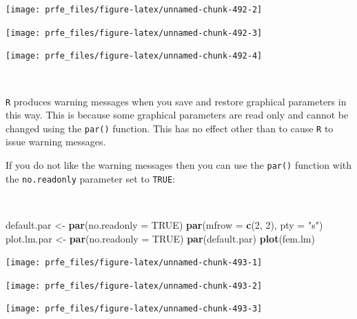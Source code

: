 \documentclass[12pt,a4paper]{book}
\newenvironment{Shaded}{\begin{snugshade}}{\end{snugshade}}
\newcommand{\KeywordTok}[1]{\textcolor[rgb]{0.13,0.29,0.53}{\textbf{#1}}}
\newcommand{\DataTypeTok}[1]{\textcolor[rgb]{0.13,0.29,0.53}{#1}}
\newcommand{\DecValTok}[1]{\textcolor[rgb]{0.00,0.00,0.81}{#1}}
\newcommand{\StringTok}[1]{\textcolor[rgb]{0.31,0.60,0.02}{#1}}
\newcommand{\OtherTok}[1]{\textcolor[rgb]{0.56,0.35,0.01}{#1}}
\newcommand{\NormalTok}[1]{#1}
\theoremstyle{definition}
\theoremstyle{definition}
\theoremstyle{definition}
\theoremstyle{remark}
\begin{document}
\begin{center}\texttt{[image: prfe\_files/figure-latex/unnamed-chunk-492-2]} \end{center}

\begin{center}\texttt{[image: prfe\_files/figure-latex/unnamed-chunk-492-3]} \end{center}

\begin{center}\texttt{[image: prfe\_files/figure-latex/unnamed-chunk-492-4]} \end{center}

~

\texttt{R} produces warning messages when you save and restore graphical
parameters in this way. This is because some graphical parameters are
read only and cannot be changed using the \texttt{par()} function. This
has no effect other than to cause \texttt{R} to issue warning messages.

If you do not like the warning messages then you can use the
\texttt{par()} function with the \texttt{no.readonly} parameter set to
\texttt{TRUE}:

~

\begin{Shaded}
\begin{Highlighting}[]
\NormalTok{default.par <-}\StringTok{ }\KeywordTok{par}\NormalTok{(}\DataTypeTok{no.readonly =} \OtherTok{TRUE}\NormalTok{)}
\KeywordTok{par}\NormalTok{(}\DataTypeTok{mfrow =} \KeywordTok{c}\NormalTok{(}\DecValTok{2}\NormalTok{, }\DecValTok{2}\NormalTok{), }\DataTypeTok{pty =} \StringTok{"s"}\NormalTok{)}
\NormalTok{plot.lm.par <-}\StringTok{ }\KeywordTok{par}\NormalTok{(}\DataTypeTok{no.readonly =} \OtherTok{TRUE}\NormalTok{)}
\KeywordTok{par}\NormalTok{(default.par)}
\KeywordTok{plot}\NormalTok{(fem.lm)}
\end{Highlighting}
\end{Shaded}

\begin{center}\texttt{[image: prfe\_files/figure-latex/unnamed-chunk-493-1]} \end{center}

\begin{center}\texttt{[image: prfe\_files/figure-latex/unnamed-chunk-493-2]} \end{center}

\begin{center}\texttt{[image: prfe\_files/figure-latex/unnamed-chunk-493-3]} \end{center}
\end{document}
